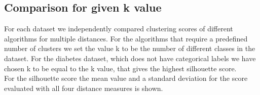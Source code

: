 \subsection{Comparison for given k value}
\marginnote{\textcolor{blue}{Jonas Elpelt}}
For each dataset we independently compared clustering scores of different algorithms for multiple distances. For the algorithms that require a predefined number of clusters we set the value k to be the number of different classes in the dataset. For the diabetes dataset, which does not have categorical labels we have chosen k to be equal to the k value, that gives the highest silhouette score. \\
For the silhouette score the mean value and a standard deviation for the score evaluated with all four distance measures is shown. 

\begin{figure}[H]
	\centering
	\qquad
	\qquad
	\qquad

\end{figure}
